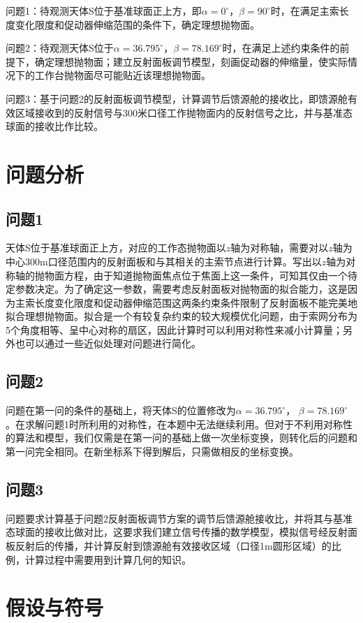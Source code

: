 \documentclass[withoutpreface,bwprint,fontset=macnew]{cumcmthesis} %
\begin{document}
	问题1：待观测天体S位于基准球面正上方，即$\alpha=0^\circ$，$\beta=90^\circ$时，在满足主索长度变化限度和促动器伸缩范围的条件下，确定理想抛物面。

	问题2：待观测天体S位于$\alpha=36.795^\circ$，$\beta=78.169^\circ$时，在满足上述约束条件的前提下，确定理想抛物面；建立反射面板调节模型，刻画促动器的伸缩量，使实际情况下的工作台抛物面尽可能贴近该理想抛物面。

	问题3：基于问题2的反射面板调节模型，计算调节后馈源舱的接收比，即馈源舱有效区域接收到的反射信号与300米口径工作抛物面内的反射信号之比，并与基准态球面的接收比作比较。

	\section{问题分析}
	\subsection{问题1}
	天体S位于基准球面正上方，对应的工作态抛物面以$z$轴为对称轴，需要对以$z$轴为中心300m口径范围内的反射面板和与其相关的主索节点进行计算。写出以$z$轴为对称轴的抛物面方程，由于知道抛物面焦点位于焦面上这一条件，可知其仅由一个待定参数决定。为了确定这一参数，需要考虑反射面板对抛物面的拟合能力，这是因为主索长度变化限度和促动器伸缩范围这两条约束条件限制了反射面板不能完美地拟合理想抛物面。拟合是一个有较复杂约束的较大规模优化问题，由于索网分布为5个角度相等、呈中心对称的扇区，因此计算时可以利用对称性来减小计算量；另外也可以通过一些近似处理对问题进行简化。

	\subsection{问题2}
	问题在第一问的条件的基础上，将天体S的位置修改为$\alpha = 36.795^\circ$， $\beta = 78.169^\circ$。在求解问题1时所利用的对称性，在本题中无法继续利用。但对于不利用对称性的算法和模型，我们仅需是在第一问的基础上做一次坐标变换，则转化后的问题和第一问完全相同。在新坐标系下得到解后，只需做相反的坐标变换。

	\subsection{问题3}
	问题要求计算基于问题2反射面板调节方案的调节后馈源舱接收比，并将其与基准态球面的接收比做对比，这要求我们建立信号传播的数学模型，模拟信号经反射面板反射后的传播，并计算反射到馈源舱有效接收区域（口径1m圆形区域）的比例，计算过程中需要用到计算几何的知识。


	\section{假设与符号}
\end{document}
